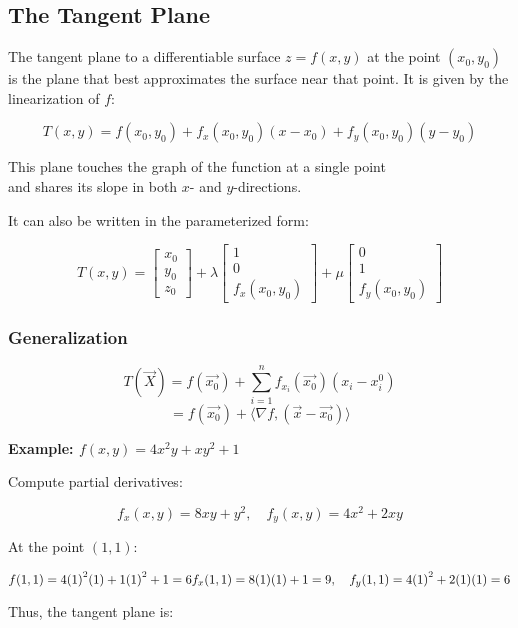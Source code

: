 \subsection{The Tangent Plane}

The tangent plane to a differentiable surface \( z = f(x, y) \) at the point \( (x_0, y_0) \) is the 
plane that best approximates the surface near that point. It is given by the linearization of \(f\):

\[
    T(x, y) = f(x_0, y_0) + f_x(x_0, y_0)(x - x_0) + f_y(x_0, y_0)(y - y_0)
\]

This plane touches the graph of the function at a single point\\
and shares its slope in both \(x\)- and \(y\)-directions.

It can also be written in the parameterized form:

\[
    T(x,y) = \begin{bmatrix} x_0\\ y_0\\ z_0\end{bmatrix} + \lambda 
    \begin{bmatrix} 1\\ 0 \\ f_x(x_0,y_0)\end{bmatrix} + \mu \begin{bmatrix}
    0 \\ 1 \\ f_y(x_0, y_0)
    \end{bmatrix}
\]

\subsubsection{Generalization}

\[
    T(\vec{X}) = f(\vec{x_0}) + \sum_{i = 1}^{n} f_{x_i}(\vec{x_0})(x_i - x_{i}^0)
\]
\[
    = f(\vec{x_0}) + \langle \nabla f, (\vec{x} - \vec{x_0})\rangle
\]

\textbf{Example: \( f(x, y) = 4x^2y + xy^2 + 1 \)}

Compute partial derivatives:

\[
    f_x(x, y) = 8xy + y^2, \quad f_y(x, y) = 4x^2 + 2xy
\]

At the point \( (1, 1) \):

\[
    f(1, 1) = 4{(1)}^2(1) + 1{(1)}^2 + 1 = 6 \\
    f_x(1, 1) = 8(1)(1) + 1 = 9, \quad f_y(1, 1) = 4{(1)}^2 + 2(1)(1) = 6
\]

Thus, the tangent plane is:


